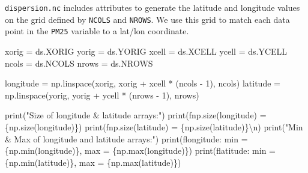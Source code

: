 \documentclass[
  letterpaper,
  DIV=11,
  numbers=noendperiod]{scrreprt}
\newenvironment{Shaded}{\begin{snugshade}}{\end{snugshade}}
\newcommand{\BuiltInTok}[1]{\textcolor[rgb]{0.00,0.23,0.31}{#1}}
\newcommand{\CharTok}[1]{\textcolor[rgb]{0.13,0.47,0.30}{#1}}
\newcommand{\DecValTok}[1]{\textcolor[rgb]{0.68,0.00,0.00}{#1}}
\newcommand{\NormalTok}[1]{\textcolor[rgb]{0.00,0.23,0.31}{#1}}
\newcommand{\OperatorTok}[1]{\textcolor[rgb]{0.37,0.37,0.37}{#1}}
\newcommand{\SpecialCharTok}[1]{\textcolor[rgb]{0.37,0.37,0.37}{#1}}
\newcommand{\SpecialStringTok}[1]{\textcolor[rgb]{0.13,0.47,0.30}{#1}}
\newcommand{\StringTok}[1]{\textcolor[rgb]{0.13,0.47,0.30}{#1}}
\begin{document}
\texttt{dispersion.nc} includes attributes to generate the latitude and
longitude values on the grid defined by \texttt{NCOLS} and
\texttt{NROWS}. We use this grid to match each data point in the
\texttt{PM25} variable to a lat/lon coordinate.

\begin{Shaded}
\begin{Highlighting}[]
\NormalTok{xorig }\OperatorTok{=}\NormalTok{ ds.XORIG}
\NormalTok{yorig }\OperatorTok{=}\NormalTok{ ds.YORIG}
\NormalTok{xcell }\OperatorTok{=}\NormalTok{ ds.XCELL}
\NormalTok{ycell }\OperatorTok{=}\NormalTok{ ds.YCELL}
\NormalTok{ncols }\OperatorTok{=}\NormalTok{ ds.NCOLS}
\NormalTok{nrows }\OperatorTok{=}\NormalTok{ ds.NROWS}

\NormalTok{longitude }\OperatorTok{=}\NormalTok{ np.linspace(xorig, xorig }\OperatorTok{+}\NormalTok{ xcell }\OperatorTok{*}\NormalTok{ (ncols }\OperatorTok{{-}} \DecValTok{1}\NormalTok{), ncols)}
\NormalTok{latitude }\OperatorTok{=}\NormalTok{ np.linspace(yorig, yorig }\OperatorTok{+}\NormalTok{ ycell }\OperatorTok{*}\NormalTok{ (nrows }\OperatorTok{{-}} \DecValTok{1}\NormalTok{), nrows)}

\BuiltInTok{print}\NormalTok{(}\StringTok{"Size of longitude \& latitude arrays:"}\NormalTok{)}
\BuiltInTok{print}\NormalTok{(}\SpecialStringTok{f\textquotesingle{}np.size(longitude) = }\SpecialCharTok{\{}\NormalTok{np}\SpecialCharTok{.}\NormalTok{size(longitude)}\SpecialCharTok{\}}\SpecialStringTok{\textquotesingle{}}\NormalTok{)}
\BuiltInTok{print}\NormalTok{(}\SpecialStringTok{f\textquotesingle{}np.size(latitude) = }\SpecialCharTok{\{}\NormalTok{np}\SpecialCharTok{.}\NormalTok{size(latitude)}\SpecialCharTok{\}}\CharTok{\textbackslash{}n}\SpecialStringTok{\textquotesingle{}}\NormalTok{)}
\BuiltInTok{print}\NormalTok{(}\StringTok{"Min \& Max of longitude and latitude arrays:"}\NormalTok{)}
\BuiltInTok{print}\NormalTok{(}\SpecialStringTok{f\textquotesingle{}longitude: min = }\SpecialCharTok{\{}\NormalTok{np}\SpecialCharTok{.}\BuiltInTok{min}\NormalTok{(longitude)}\SpecialCharTok{\}}\SpecialStringTok{, max = }\SpecialCharTok{\{}\NormalTok{np}\SpecialCharTok{.}\BuiltInTok{max}\NormalTok{(longitude)}\SpecialCharTok{\}}\SpecialStringTok{\textquotesingle{}}\NormalTok{)}
\BuiltInTok{print}\NormalTok{(}\SpecialStringTok{f\textquotesingle{}latitude: min = }\SpecialCharTok{\{}\NormalTok{np}\SpecialCharTok{.}\BuiltInTok{min}\NormalTok{(latitude)}\SpecialCharTok{\}}\SpecialStringTok{, max = }\SpecialCharTok{\{}\NormalTok{np}\SpecialCharTok{.}\BuiltInTok{max}\NormalTok{(latitude)}\SpecialCharTok{\}}\SpecialStringTok{\textquotesingle{}}\NormalTok{)}
\end{Highlighting}
\end{Shaded}
\end{document}
